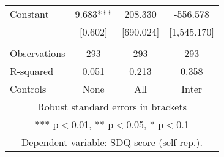 \begin{tabular}{lccc}
Constant & 9.683*** & 208.330 & -556.578 \\
 & [0.602] & [690.024] & [1,545.170] \\
 &  &  &  \\
Observations & 293 & 293 & 293 \\
R-squared & 0.051 & 0.213 & 0.358 \\
 Controls & None & All & Inter \\ \hline
\multicolumn{4}{c}{ Robust standard errors in brackets} \\
\multicolumn{4}{c}{ *** p$<$0.01, ** p$<$0.05, * p$<$0.1} \\
\multicolumn{4}{c}{ Dependent variable: SDQ score (self rep.).} \\
\end{tabular}
